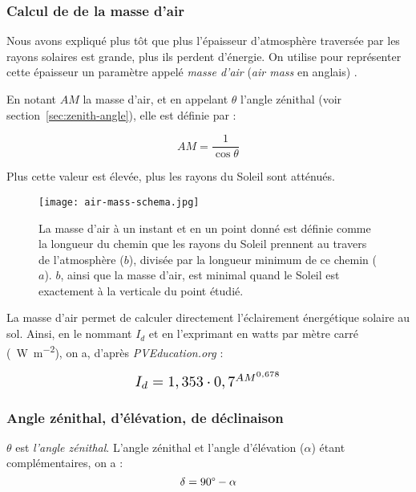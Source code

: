 \documentclass[12pt]{article}
\begin{document}
\subsubsection{Calcul de de la masse d'air}

Nous avons expliqué plus tôt que plus l'épaisseur d'atmosphère traversée par les rayons solaires est grande, plus ils perdent d'énergie.
On utilise pour représenter cette épaisseur un paramètre appelé \emph{masse d'air} (\textit{air mass} en anglais) \cite{air_mass_wiki}.

En notant $AM$ la masse d'air, et en appelant $\theta$ l'angle zénithal (voir section~\ref{sec:zenith-angle}), elle est définie par :

\[
	AM = \frac{1 }{\cos \theta}
\]

Plus cette valeur est élevée, plus les rayons du Soleil sont atténués.

\begin{figure}[H]
	\centerline{\texttt{[image: air-mass-schema.jpg]}}
	\caption{La masse d'air à un instant et en un point donné est définie comme la longueur du chemin que les rayons du Soleil prennent au travers de l'atmosphère ($b$), divisée par la longueur minimum de ce chemin ($a$). $b$, ainsi que la masse d'air, est minimal quand le Soleil est exactement à la verticale du point étudié.}
	\label{fig:air-mass}
\end{figure}

La masse d'air permet de calculer directement l'éclairement énergétique solaire au sol.
Ainsi, en le nommant $I_d$ et en l'exprimant en watts par mètre carré (\SI{}{\watt\per\square\meter}), on a, d'après \emph{PVEducation.org} \cite{pos_air_mass} :

\[
	\scalebox{1.3}{
		$I_d = 1,353 \cdot 0,7^{{AM}^{0,678}}$
	}
\]


\subsubsection{Angle zénithal, d'élévation, de déclinaison}
$\theta$ est \emph{l'angle zénithal}. L'angle zénithal et l'angle d'élévation ($\alpha$) étant complémentaires, on a :
\[
	\delta = 90\degree - \alpha
\]

\end{document}
